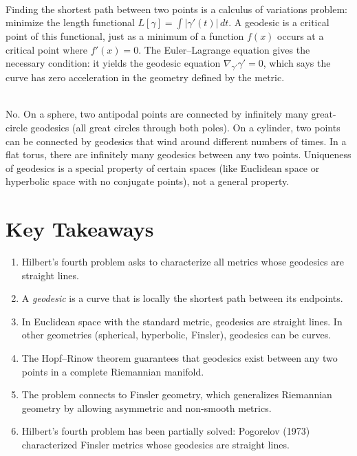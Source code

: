 \begin{description}[font=\bfseries, leftmargin=2em, style=nextline]
\item[Q: How does the Euler--Lagrange equation relate to geodesics?]\hfill\\
Finding the shortest path between two points is a calculus of variations problem: minimize the length functional $L[\gamma] = \int |\gamma'(t)| \, dt$. A geodesic is a critical point of this functional, just as a minimum of a function $f(x)$ occurs at a critical point where $f'(x)=0$. The Euler--Lagrange equation gives the necessary condition: it yields the geodesic equation $\nabla_{\gamma'}\gamma' = 0$, which says the curve has zero acceleration in the geometry defined by the metric.

\item[Q: Are geodesics always unique?]\hfill\\
No. On a sphere, two antipodal points are connected by infinitely many great-circle geodesics (all great circles through both poles). On a cylinder, two points can be connected by geodesics that wind around different numbers of times. In a flat torus, there are infinitely many geodesics between any two points. Uniqueness of geodesics is a special property of certain spaces (like Euclidean space or hyperbolic space with no conjugate points), not a general property.

\end{description}

\section{Key Takeaways}

\begin{enumerate}
    \item Hilbert's fourth problem asks to characterize all metrics whose geodesics are straight lines.
    \item A \emph{geodesic} is a curve that is locally the shortest path between its endpoints.
    \item In Euclidean space with the standard metric, geodesics are straight lines. In other geometries (spherical, hyperbolic, Finsler), geodesics can be curves.
    \item The Hopf--Rinow theorem guarantees that geodesics exist between any two points in a complete Riemannian manifold.
    \item The problem connects to Finsler geometry, which generalizes Riemannian geometry by allowing asymmetric and non-smooth metrics.
    \item Hilbert's fourth problem has been partially solved: Pogorelov (1973) characterized Finsler metrics whose geodesics are straight lines.
\end{enumerate}

